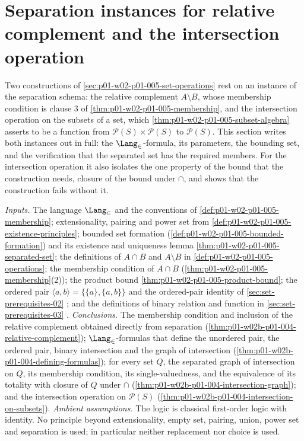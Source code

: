 \section{Separation instances for relative complement and the intersection operation}
\label{sec:p01-w02b-p01-004-separation-instances}

Two constructions of \cref{sec:p01-w02-p01-005-set-operations} rest on an
instance of the separation schema: the relative complement \(A\setminus B\),
whose membership condition is clause 3 of
\cref{thm:p01-w02-p01-005-membership}, and the intersection operation on the
subsets of a set, which \cref{thm:p01-w02-p01-005-subset-algebra} asserts to
be a function from \(\mathcal P(S)\times\mathcal P(S)\) to \(\mathcal P(S)\).
This section writes both instances out in full: the \(\Lang_{\in}\)-formula, its
parameters, the bounding set, and the verification that the separated set has
the required members. For the intersection operation it also isolates the one
property of the bound that the construction needs, closure of the bound under
\(\cap\), and shows that the construction fails without it.

\emph{Inputs.} The language \(\Lang_{\in}\) and the conventions of
\cref{def:p01-w02-p01-005-membership}; extensionality, pairing and power set
from \cref{def:p01-w02-p01-005-existence-principles}; bounded set formation
(\cref{def:p01-w02-p01-005-bounded-formation}) and its existence and
uniqueness lemma \cref{thm:p01-w02-p01-005-separated-set}; the definitions of
\(A\cap B\) and \(A\setminus B\) in \cref{def:p01-w02-p01-005-operations}; the
membership condition of \(A\cap B\) (\cref{thm:p01-w02-p01-005-membership}(2));
the product bound \cref{thm:p01-w02-p01-005-product-bound}; the ordered pair
\(\langle a,b\rangle=\{\{a\},\{a,b\}\}\) and the ordered-pair identity of
\cref{sec:set-prerequisites-02}
\cite[ch.~``Sets, Relations, Functions, and Cardinality'', sec.~``Ordered pairs
and products'', definition ``Ordered pair'' and lemma ``Ordered-pair
identity'']{FrozenFormalLogicSetOperations}; and the definitions of binary
relation and function in \cref{sec:set-prerequisites-03}
\cite[ch.~``Sets, Relations, Functions, and Cardinality'', sec.~``Relations
and functions'', definition ``Function'']{FrozenFormalLogicSetOperations}.
\emph{Conclusions.} The membership condition and inclusion of the relative
complement obtained directly from separation
(\cref{thm:p01-w02b-p01-004-relative-complement}); \(\Lang_{\in}\)-formulas that
define the unordered pair, the ordered pair, binary intersection and the graph
of intersection (\cref{thm:p01-w02b-p01-004-defining-formulas}); for every set
\(Q\), the separated graph of intersection on \(Q\), its membership condition,
its single-valuedness, and the equivalence of its totality with closure of
\(Q\) under \(\cap\) (\cref{thm:p01-w02b-p01-004-intersection-graph}); and the
intersection operation on \(\mathcal P(S)\)
(\cref{thm:p01-w02b-p01-004-intersection-on-subsets}). \emph{Ambient
assumptions.} The logic is classical first-order logic with identity. No
principle beyond extensionality, empty set, pairing, union, power set and
separation is used; in particular neither replacement nor choice is used.

